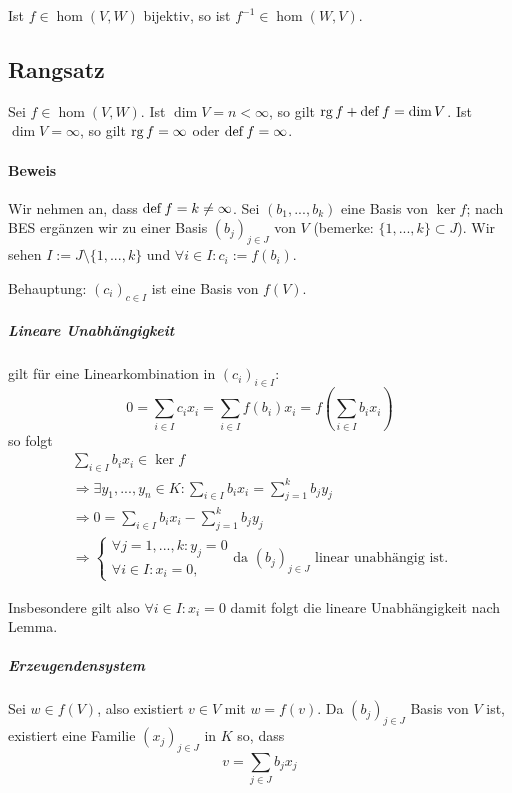 	Ist $ f\in \hom (V,W) $ bijektiv, so ist $ f^{-1}\in \hom (W,V) $.

\subsection{Rangsatz}
	\begin{Satz}[Rangsatz]
		Sei $ f\in \hom (V,W) $. Ist $ \dim V = n < \infty $,  so gilt $\operatorname{rg} f + \operatorname{def} f = \dim V$.  Ist $ \dim V = \infty $, so gilt $ \operatorname{rg} f = \infty $ oder $ \operatorname{def} f = \infty $.
	\end{Satz}

\paragraph{Beweis}
	Wir nehmen an, dass $ \operatorname{def} f = k \neq \infty $.
	Sei $ (b_1,...,b_k) $ eine Basis von $ \ker f $;
	nach BES ergänzen wir zu einer Basis $ (b_j)_{j\in J} $ von $ V $ (bemerke: $ \{1,...,k\}\subset J $).
	Wir sehen $ I:= J\setminus \{1,...,k\} $ und $ \forall i\in I: c_i := f(b_i) $.
	
	Behauptung: $(c_i)_{c\in I}$ ist eine Basis von $f(V)$.
	
\subparagraph{Lineare Unabhängigkeit}
	gilt für eine Linearkombination in $(c_i)_{i\in I}$:
		\[ 0=\sum_{i\in I}c_ix_i = \sum_{i\in I}f(b_i)x_i = f(\sum_{i\in I}b_ix_i)
		 \]
	so folgt
	\begin{gather*}
		\sum_{i\in I}b_ix_i \in \ker f\\
		\Rightarrow \exists y_1,...,y_n\in K:\sum_{i\in I}b_ix_i=\sum_{j=1}^{k}b_jy_j\\
		\Rightarrow 0 = \sum_{i\in I}b_ix_i - \sum_{j=1}^{k}b_jy_j\\
		\Rightarrow
		\begin{cases}
			\forall j = 1, ... ,k:y_j=0\\
			\forall i\in I: x_i = 0,
		\end{cases}
		\text{da $(b_j)_{j\in J}$ linear unabhängig ist.}
	\end{gather*}
			
	Insbesondere gilt also $\forall i\in I: x_i = 0$ damit folgt die lineare Unabhängigkeit nach Lemma.
	
\subparagraph{Erzeugendensystem}
	
	Sei $w\in f(V)$, also existiert $v\in V$ mit $w = f(v)$. Da $(b_j)_{j\in J}$ Basis von $V$ ist, existiert eine Familie $(x_j)_{j\in J}$ in $K$ so, dass 
	\begin{equation*}
		v = \sum_{j\in J} b_jx_j
	\end{equation*}
	
